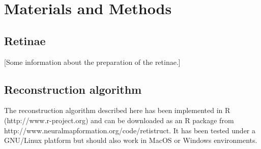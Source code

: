 \documentclass[10pt]{article}
\newcommand{\todo}[1]{{\color{red}[#1]}}
\begin{document}

\section*{Materials and Methods}
\label{retistruct_plos:sec:materials-methods}

\subsection*{Retinae}
\label{retistruct_plos:sec:retinae}

\todo{Some information about the preparation of the retinae.}

\subsection*{Reconstruction algorithm}
\label{retistruct_plos:sec:reconstr-algor}

The reconstruction algorithm described here has been implemented in R
(http://www.r-project.org) and can be downloaded as an R package from
http://www.neuralmapformation.org/code/retistruct. It has been tested
under a GNU/Linux platform but should also work in MacOS or Windows
environments.
\end{document}
